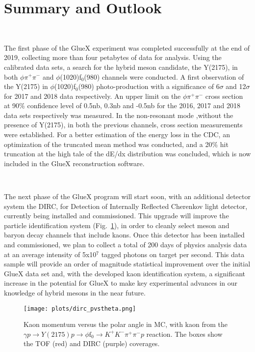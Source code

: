 \section{Summary and Outlook}
\label{p.5}

~\par The first phase of the GlueX experiment was completed successfully at the end of 2019, collecting more than four petabytes of data for analysis. Using the calibrated data sets, a search for the hybrid meson candidate, the Y(2175), in both $\phi\pi^{+}\pi^{-}$ and $\phi$(1020)f$_0$(980) channels were conducted. A first observation of the Y(2175) in $\phi$(1020)f$_0$(980) photo-production with a significance of 6$\sigma$ and 12$\sigma$ for 2017 and 2018 data respectively. An upper limit on the $\phi\pi^{+}\pi^{-}$ cross section at 90$\%$ confidence level of 0.5nb, 0.3nb and -0.5nb for the 2016, 2017 and 2018 data sets respectively was measured. In the non-resonant mode ,without the presence of Y(2175), in both the previous channels, cross section measurements were established. For a better estimation of the energy loss in the CDC, an optimization of the truncated mean method was conducted, and a 20$\%$ hit truncation at the high tale of the dE/dx distribution was concluded, which is now included in the GlueX reconstruction software.

~\par The next phase of the GlueX program will start soon, with an additional detector system the DIRC, for Detection of Internally Reflected Cherenkov light detector, currently being installed and commissioned. This upgrade will improve the particle identification system (Fig.~\ref{fig.5.1}), in order to cleanly select meson and baryon decay channels that include kaons. Once this detector has been installed and commissioned, we plan to collect a total of 200 days of physics analysis data at an average intensity of 5x10$^7$ tagged photons on target per second. This data sample will provide an order of magnitude statistical improvement over the initial GlueX data set and, with the developed kaon identification system, a significant increase in the potential for GlueX to make key experimental advances in our knowledge of hybrid mesons in the near future.

\begin{figure}[H]
    \centering
        \texttt{[image: plots/dirc\_pvstheta.png]}
        \caption{Kaon momentum versus the polar angle in MC, with kaon from the $\gamma p \rightarrow Y(2175) p \rightarrow \phi \mathrm{f}_0  \rightarrow  K^{+} K^{-} \pi^{+} \pi^{-} p$ reaction. The boxes show the TOF (red) and DIRC (purple) coverages.}
        \label{fig.5.1}
\end{figure}